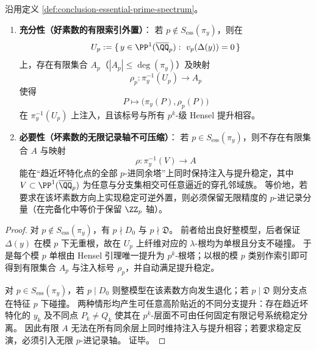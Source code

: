 \begin{theorem}[分歧素数谱的记录轴最小性]\label{thm:conclusion-essential-prime-axis-minimality}
沿用定义 \ref{def:conclusion-essential-prime-spectrum}。
\begin{enumerate}
  \item \textbf{充分性（好素数的有限索引外置）}：
  若 \(p\notin S_{\mathrm{ess}}(\pi_y)\)，则在
  \[
  U_p:=\{\,y\in\PP^1(\overline{\QQ}_p):\ v_p(\Delta(y))=0\,\}
  \]
  上，存在有限集合 \(A_p\)（\(|A_p|\le \deg(\pi_y)\)）及映射
  \[
  \rho_p:\pi_y^{-1}(U_p)\longrightarrow A_p
  \]
  使得
  \[
  P\longmapsto \bigl(\pi_y(P),\rho_p(P)\bigr)
  \]
  在 \(\pi_y^{-1}(U_p)\) 上注入，且该标号与所有 \(p^k\)-级 Hensel 提升相容。

  \item \textbf{必要性（坏素数的无限记录轴不可压缩）}：
  若 \(p\in S_{\mathrm{ess}}(\pi_y)\)，则不存在有限集合 \(A\) 与映射
  \[
  \rho:\pi_y^{-1}(V)\to A
  \]
  能在“趋近坏特化点的全部 \(p\)-进同余塔”上同时保持注入与提升稳定，其中 \(V\subset\PP^1(\overline{\QQ}_p)\) 为任意与分支集相交可任意逼近的穿孔邻域族。
  等价地，若要求在该坏素数方向上实现稳定可逆外置，则必须保留无限精度的 \(p\)-进记录分量（在完备化中等价于保留 \(\ZZ_p\) 轴）。
\end{enumerate}
\end{theorem}
\begin{proof}
对 \(p\notin S_{\mathrm{ess}}(\pi_y)\)，有 \(p\nmid D_0\) 与 \(p\nmid\mathfrak D\)。
前者给出良好整模型，后者保证 \(\Delta(y)\) 在模 \(p\) 下无重根，故在 \(U_p\) 上纤维对应的 \(\lambda\)-根均为单根且分支不碰撞。
于是每个模 \(p\) 单根由 Hensel 引理唯一提升为 \(p^k\)-根塔；以根的模 \(p\) 类别作索引即可得到有限集合 \(A_p\) 与注入标号 \(\rho_p\)，并自动满足提升稳定。

对 \(p\in S_{\mathrm{ess}}(\pi_y)\)，若 \(p\mid D_0\) 则整模型在该素数方向发生退化；若 \(p\mid\mathfrak D\) 则分支点在特征 \(p\) 下碰撞。
两种情形均产生可任意高阶贴近的不同分支提升：存在趋近坏特化的 \(y_k\) 及不同点 \(P_k\neq Q_k\) 使其在 \(p^k\)-层面不可由任何固定有限记号系统稳定分离。
因此有限 \(A\) 无法在所有同余层上同时维持注入与提升相容；若要求稳定反演，必须引入无限 \(p\)-进记录轴。
证毕。
\end{proof}

